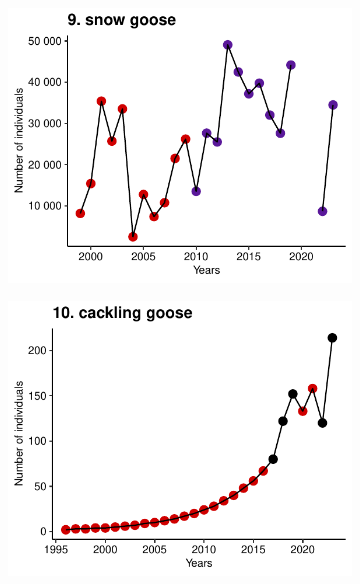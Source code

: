 \documentclass[a4paper,twoside,10pt]{article}
\begin{document}
\begin{figure}[H]
\centering
\begin{subfigure}{0.45\textwidth}
\includegraphics[width=\linewidth]{figures/species_temporal_series/snow_goose.pdf}
\end{subfigure}
\begin{subfigure}{0.45\textwidth}
\includegraphics[width=\linewidth]{figures/species_temporal_series/cackling_goose.pdf}
\end{subfigure}
\hfill
\begin{subfigure}{0.45\textwidth}

\end{subfigure}
\end{figure}
\end{document}

